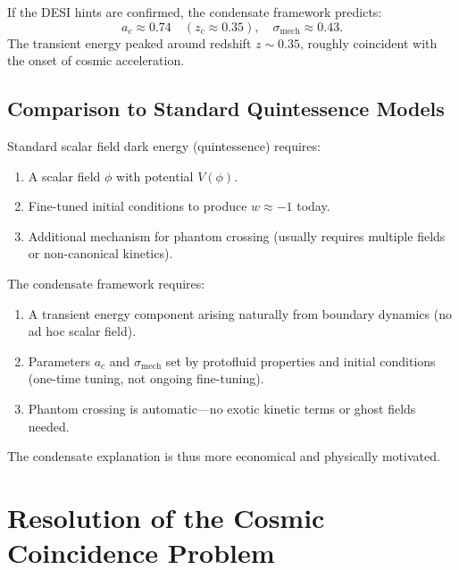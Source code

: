 \documentclass[11pt,a4paper]{article}
\theoremstyle{definition}
\theoremstyle{remark}
\begin{document}
\begin{result}
\label{result:parameters_from_desi}
If the DESI hints are confirmed, the condensate framework predicts:
\begin{equation}
\boxed{a_c \approx 0.74 \quad (z_c \approx 0.35), \quad \sigma_{\mathrm{mech}} \approx 0.43.}
\end{equation}
The transient energy peaked around redshift $z \sim 0.35$, roughly coincident with the onset of cosmic acceleration.
\end{result}

\subsection{Comparison to Standard Quintessence Models}
\label{sec:quintessence_comparison}

Standard scalar field dark energy (quintessence) requires:
\begin{enumerate}[label=(\roman*)]
\item A scalar field $\phi$ with potential $V(\phi)$.
\item Fine-tuned initial conditions to produce $w \approx -1$ today.
\item Additional mechanism for phantom crossing (usually requires multiple fields or non-canonical kinetics).
\end{enumerate}

The condensate framework requires:
\begin{enumerate}[label=(\roman*)]
\item A transient energy component arising naturally from boundary dynamics (no ad hoc scalar field).
\item Parameters $a_c$ and $\sigma_{\mathrm{mech}}$ set by protofluid properties and initial conditions (one-time tuning, not ongoing fine-tuning).
\item Phantom crossing is automatic---no exotic kinetic terms or ghost fields needed.
\end{enumerate}

The condensate explanation is thus more economical and physically motivated.

\section{Resolution of the Cosmic Coincidence Problem}
\label{sec:coincidence}
\end{document}
